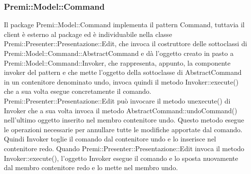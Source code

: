 {{		\subsubsection{Premi::Model::Command}{
			Il package Premi::Model::Command implementa il pattern Command, tuttavia il client è esterno al package ed è individuabile nella classe Premi::Presenter::Presentazione::Edit, che invoca il costruttore delle sottoclassi di Premi::Model::Command::AbstractCommand e dà l'oggetto creato in pasto a Premi::Model::Command::Invoker, che rappresenta, appunto, la componente invoker del pattern e che mette l'oggetto della sottoclasse di AbstractCommand in un contenitore denominato undo, invoca quindi il metodo Invoker::execute() che a sua volta esegue concretamente il comando.\\
			Premi::Presenter::Presentazione::Edit può invocare il metodo unexecute() di Invoker che a sua volta invoca il metodo AbstractCommand::undoCommand() nell'ultimo oggetto inserito nel membro contenitore undo. Questo metodo esegue le operazioni necessarie per annullare tutte le modifiche apportate dal comando. Quindi Invoker toglie il comando dal contenitore undo e lo inserisce nel contenitore redo. Quando Premi::Presenter::Presentazione::Edit invoca il metodo Invoker::execute(), l'oggetto Invoker esegue il comando e lo sposta nuovamente dal membro contenitore redo e lo mette nel membro undo.    
		}
	}
}